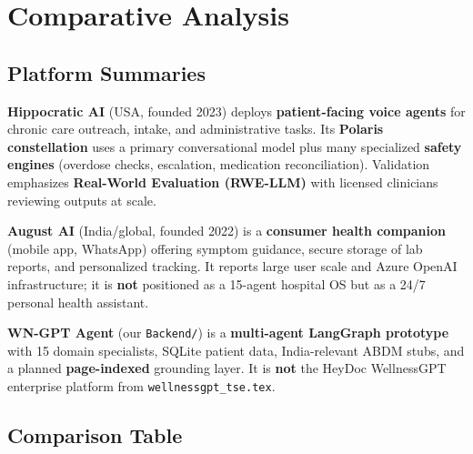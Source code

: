 \documentclass[12pt,a4paper]{article}
\begin{document}
\newpage

\section{Comparative Analysis}

\subsection{Platform Summaries}

\textbf{Hippocratic AI} (USA, founded 2023) deploys \textbf{patient-facing voice agents} for chronic care outreach, intake, and administrative tasks. Its \textbf{Polaris constellation} uses a primary conversational model plus many specialized \textbf{safety engines} (overdose checks, escalation, medication reconciliation). Validation emphasizes \textbf{Real-World Evaluation (RWE-LLM)} with licensed clinicians reviewing outputs at scale.

\textbf{August AI} (India/global, founded 2022) is a \textbf{consumer health companion} (mobile app, WhatsApp) offering symptom guidance, secure storage of lab reports, and personalized tracking. It reports large user scale and Azure OpenAI infrastructure; it is \textbf{not} positioned as a 15-agent hospital OS but as a 24/7 personal health assistant.

\textbf{WN-GPT Agent} (our \texttt{Backend/}) is a \textbf{multi-agent LangGraph prototype} with 15 domain specialists, SQLite patient data, India-relevant ABDM stubs, and a planned \textbf{page-indexed} grounding layer. It is \textbf{not} the HeyDoc WellnessGPT enterprise platform from \texttt{wellnessgpt\_tse.tex}.

\subsection{Comparison Table}
\end{document}
